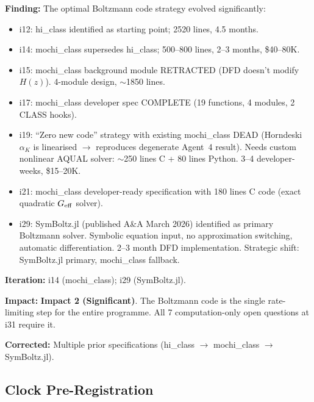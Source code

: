 \documentclass[11pt,a4paper]{article}
\newcommand{\imptwo}{\textcolor{impact2}{\textbf{Impact 2 (Significant)}}}
\begin{document}
\begin{tcolorbox}[colback=green!5!white, colframe=green!50!black,
  title=\textbf{Boltzmann Code: mochi\_class $\to$ SymBoltz.jl --- Iterations 14--29}]

\textbf{Finding:} The optimal Boltzmann code strategy evolved
significantly:
\begin{itemize}
  \item i12: hi\_class identified as starting point; 2520 lines, 4.5 months.
  \item i14: mochi\_class supersedes hi\_class; 500--800 lines, 2--3 months,
    \$40--80K.
  \item i15: mochi\_class background module RETRACTED (DFD doesn't modify
    $H(z)$). 4-module design, $\sim$1850 lines.
  \item i17: mochi\_class developer spec COMPLETE (19 functions, 4 modules,
    2 CLASS hooks).
  \item i19: ``Zero new code'' strategy with existing mochi\_class DEAD
    (Horndeski $\alpha_K$ is linearised $\to$ reproduces degenerate
    Agent~4 result). Needs custom nonlinear AQUAL solver: $\sim$250 lines
    C + 80 lines Python. 3--4 developer-weeks, \$15--20K.
  \item i21: mochi\_class developer-ready specification with 180 lines C
    code (exact quadratic $G_{\rm eff}$ solver).
  \item i29: SymBoltz.jl (published A\&A March 2026) identified as
    primary Boltzmann solver. Symbolic equation input, no approximation
    switching, automatic differentiation. 2--3 month DFD implementation.
    Strategic shift: SymBoltz.jl primary, mochi\_class fallback.
\end{itemize}

\textbf{Iteration:} i14 (mochi\_class); i29 (SymBoltz.jl).

\textbf{Impact:} \imptwo. The Boltzmann code is the single rate-limiting
step for the entire programme. All 7 computation-only open questions at
i31 require it.

\textbf{Corrected:} Multiple prior specifications (hi\_class $\to$
mochi\_class $\to$ SymBoltz.jl).

\end{tcolorbox}

\subsection{Clock Pre-Registration}
\label{sec:clock}
\end{document}
